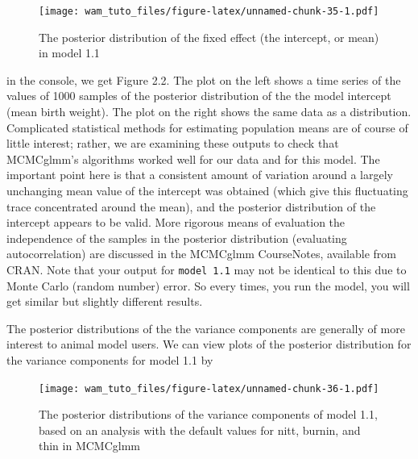 \documentclass[
  12pt,
]{book}
\newenvironment{Shaded}{\begin{snugshade}}{\end{snugshade}}
\newcommand{\FloatTok}[1]{\textcolor[rgb]{0.00,0.00,0.81}{#1}}
\newcommand{\KeywordTok}[1]{\textcolor[rgb]{0.13,0.29,0.53}{\textbf{#1}}}
\newcommand{\NormalTok}[1]{#1}
\newcommand{\OperatorTok}[1]{\textcolor[rgb]{0.81,0.36,0.00}{\textbf{#1}}}
\begin{document}
\begin{Shaded}
\end{Shaded}

\begin{figure}
\centering
\texttt{[image: wam\_tuto\_files/figure-latex/unnamed-chunk-35-1.pdf]}
\caption{\label{fig:unnamed-chunk-35}The posterior distribution of the fixed effect (the intercept, or mean) in model 1.1}
\end{figure}

in the console, we get Figure 2.2. The plot on the left shows a time series of the values of 1000 samples of the posterior distribution of the the model intercept (mean birth weight). The plot on the right shows the same data as a distribution. Complicated statistical methods for estimating population means are of course of little interest; rather, we are examining these outputs to check that MCMCglmm's algorithms worked well for our data and for this model. The important point here is that a consistent amount of variation around a largely unchanging mean value of the intercept was obtained (which give this fluctuating trace concentrated around the mean), and the posterior distribution of the intercept appears to be valid. More rigorous means of evaluation the independence of the samples in the posterior distribution (evaluating autocorrelation) are discussed in the MCMCglmm CourseNotes, available from CRAN. Note that your output for \texttt{model\ 1.1} may not be identical to this due to Monte Carlo (random number) error. So every times, you run the model, you will get similar but slightly different results.

The posterior distributions of the the variance components are generally of more interest to animal model users. We can view plots of the posterior distribution for the variance components for model 1.1 by

\begin{Shaded}
\end{Shaded}

\begin{figure}
\centering
\texttt{[image: wam\_tuto\_files/figure-latex/unnamed-chunk-36-1.pdf]}
\caption{\label{fig:unnamed-chunk-36}The posterior distributions of the variance components of model 1.1, based on an analysis with the default values for nitt, burnin, and thin in MCMCglmm}
\end{figure}
\end{document}
